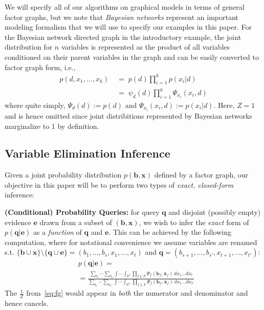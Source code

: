 \documentclass[letterpaper]{article}
\renewcommand{\vec}[1]{\mathbf{#1}}
\begin{document}
We will specify all of our algorithms on graphical models in terms of 
general factor graphs, but we note that \emph{Bayesian networks} represent
an important modeling formalism that we will use to specify our examples
in this paper.  For the Bayesian network directed graph 
in the introductory example, the joint distribution
for $n$ variables is represented as the product of all variables
conditioned on their parent variables in the graph and can be
easily converted to factor graph form, i.e., 
{\small
\vspace{-2mm}
\begin{align}
p(d,x_1,\ldots,x_k) \; & = \; p(d) \prod_{i=1}^k p(x_i|d) \nonumber \\
& = \; \psi_d(d) \prod_{i=1}^k \Psi_{x_i} (x_i,d) \label{eq:bn}
\end{align}
}
where quite simply, $\Psi_{d} (d) := p(d)$ and $\Psi_{x_i} (x_i,d) :=
p(x_i|d)$.  Here, $Z=1$ and is hence omitted since joint distribitions
represented by Bayesian networks marginalize to 1 by definition.


\subsection{Variable Elimination Inference}

Given a joint probability distribution $p(\vec{b},\vec{x})$
defined by a factor graph, our objective in this paper will
be to perform two types of \emph{exact, closed-form} inference:

{\bf (Conditional) Probability Queries:} for query
$\vec{q}$ and disjoint (possibly empty) 
evidence $\vec{e}$ drawn from 
a subset of $(\vec{b},\vec{x})$, we wish to infer 
the \emph{exact}
form of $p(\vec{q}|\vec{e})$ as a \emph{function} of 
$\vec{q}$ and $\vec{e}$.  This can be 
achieved by the following computation, where 
for notational convenience we assume variables are renamed s.t. 
$\{ \vec{b} \cup \vec{x} \} \setminus \{ \vec{q} \cup \vec{e} \} = ( b_1,\ldots,b_s,x_1,\ldots,x_t)$ and 
$\vec{q} = (b_{s+1},\ldots,b_{s'},x_{t+1},\ldots,x_{t'})$:
\begin{align}
& p(\vec{q}|\vec{e}) = \label{eq:cprob}\\
& = \frac{\sum_{b_1} \cdots \sum_{b_s} \int \cdots \int_{\mathbb{R}^t} \prod_{f \in F} \Psi_f(\vec{b}_f,\vec{x}_f) \, dx_1 \ldots dx_t}
{\sum_{b_1} \cdots \sum_{b_{s'}} \int \cdots \int_{\mathbb{R}^{t'}} \prod_{f \in F} \Psi_f(\vec{b}_f,\vec{x}_f) \, dx_1 \ldots dx_{t'}} \nonumber
\end{align}
The $\frac{1}{Z}$ from~\eqref{eq:fg} would appear in \emph{both}
the numerator and denominator and hence cancels.
\end{document}
